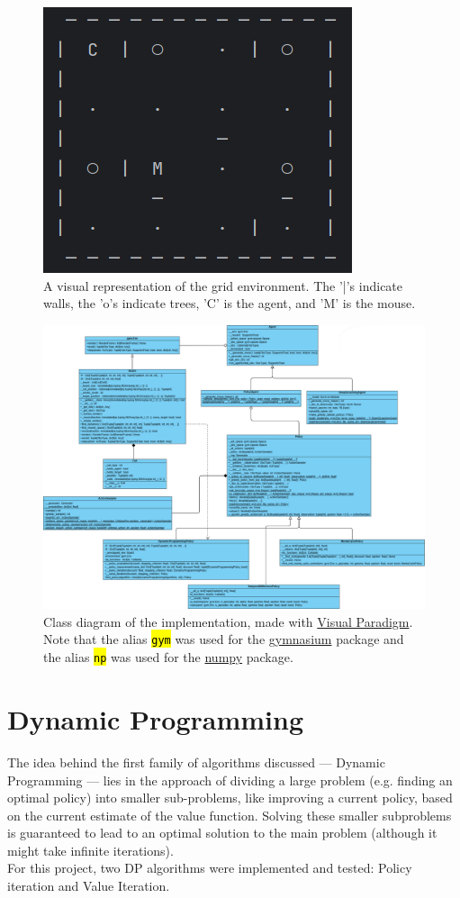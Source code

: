 \documentclass{class}
\def\code#1{\hl{\texttt{#1}}}
\begin{document}
\begin{figure}[H]
    \centering
    \includegraphics[width=0.5\linewidth]{images/environment.png}
    \caption{A visual representation of the grid environment. The '|'s indicate walls, the 'o's indicate trees, 'C' is the agent, and 'M' is the mouse.}
    \label{fig:environment}
\end{figure}

\begin{figure}
    \centering
    \includegraphics[width=0.99\linewidth]{plots/rl_project_uml.png}
    \caption{Class diagram of the implementation, made with \href{https://online.visual-paradigm.com/}{Visual Paradigm}. Note that the alias \code{gym} was used for the \href{https://gymnasium.farama.org/}{gymnasium} package and the alias \code{np} was used for the \href{https://numpy.org/doc/2.1/index.html}{numpy} package.}
    \label{fig: class diagram}
\end{figure}

\section{Dynamic Programming}
\label{sec: dynamic programming}
The idea behind the first family of algorithms discussed --- Dynamic Programming --- lies in the approach of dividing a large problem (e.g. finding an optimal policy) into smaller sub-problems, like improving a current policy, based on the current estimate of the value function. Solving these smaller subproblems is guaranteed to lead to an optimal solution to the main problem (although it might take infinite iterations).
\\[0.3cm]
For this project, two DP algorithms were implemented and tested: Policy iteration and Value Iteration.
\end{document}
